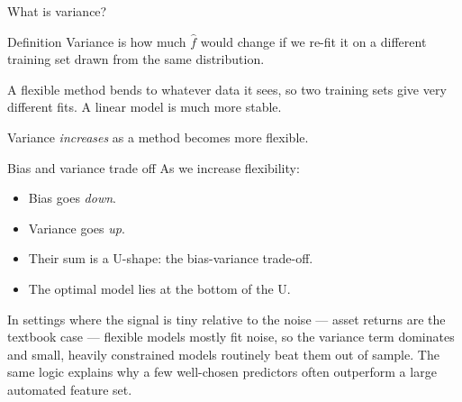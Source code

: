 \documentclass[aspectratio=169,11pt]{beamer}
\begin{document}
\begin{frame}{What is variance?}
  \begin{block}{Definition}
    Variance is how much $\hat f$ would change if we re-fit it on a
    different training set drawn from the same distribution.
  \end{block}
  \begin{numexample}
    A flexible method bends to whatever data it sees, so two training
    sets give very different fits. A linear model is much more
    stable.
  \end{numexample}
  \begin{takeaway}
    Variance \emph{increases} as a method becomes more flexible.
  \end{takeaway}
\end{frame}

\begin{frame}{Bias and variance trade off}
  As we increase flexibility:
  \begin{itemize}
    \item Bias goes \emph{down}.
    \item Variance goes \emph{up}.
    \item Their sum is a U-shape: the bias-variance trade-off.
    \item The optimal model lies at the bottom of the U.
  \end{itemize}
  \begin{industry}
    In settings where the signal is tiny relative to the noise --- asset returns are the
    textbook case --- flexible models mostly fit noise, so the variance term dominates and
    small, heavily constrained models routinely beat them out of sample. The same logic
    explains why a few well-chosen predictors often outperform a large automated feature set.
  \end{industry}
\end{frame}
\end{document}
